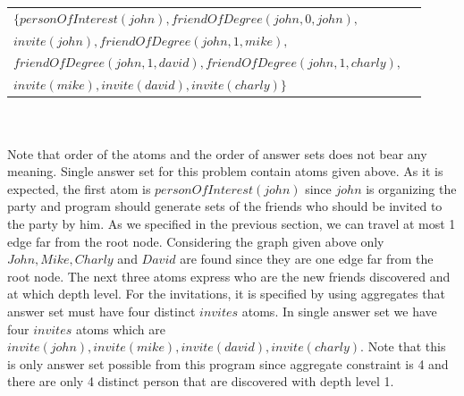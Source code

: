 \documentclass[14pt,a4paper, titlepage]{article}
\begin{document}
\begin{tabular}{ l r }
   $\mathit{\{personOfInterest(john), friendOfDegree(john,0,john), }$& \\
   $\mathit{invite(john), friendOfDegree(john,1,mike),}$& \\
   $\mathit{friendOfDegree(john,1,david), friendOfDegree(john,1,charly),}$ & \\
   $\mathit{invite(mike),invite(david),invite(charly)\}}$
 \end{tabular}
\\ \\
Note that order of the atoms and the order of answer sets does not bear any meaning. Single answer set for this problem contain atoms given above. As it is expected, the first atom is $\mathit{personOfInterest(john)}$ 
since $\mathit{john}$ is organizing the party and program should generate sets of the friends who should be invited to the party by him. As we specified in the previous section, we can travel at most 1 edge far from the root node. Considering the graph given above only $\mathit{John, Mike, Charly}$ and $\mathit{David}$ are found since they are one edge far from the root node. The next three atoms express who are the new friends discovered and at which depth 
level. For the invitations, it is specified by using aggregates that answer set must have four distinct $\mathit{invites}$ atoms.
In single answer set we have four $\mathit{invites}$ atoms which are $\mathit{invite(john), 
invite(mike), invite(david), invite(charly)}$. Note that this is only answer set possible 
from this program since aggregate constraint is 4 and there are only 4 distinct person that are discovered with depth level 1. 
\end{document}
